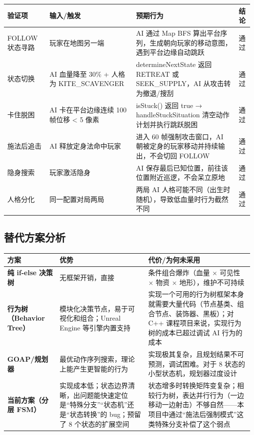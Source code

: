 \documentclass[utf8]{ctexart}
\begin{document}
\begin{longtable}{p{}p{}p{}p{}}
\toprule
\textbf{验证项} & \textbf{输入/触发} & \textbf{预期行为} & \textbf{结论} \\
\midrule
\endfirsthead
\bottomrule
\endhead
FOLLOW 状态寻路 & 玩家在地图另一端 & AI 通过 Map BFS 算出平台序列，生成朝向玩家的移动意图，遇到平台边缘自动跳跃 & 通过 \\
\hline
状态切换 & AI 血量降至 30\% + 人格为 KITE\_SCAVENGER & determineNextState 返回 RETREAT 或 SEEK\_SUPPLY，AI 从攻击转为撤退/搜刮 & 通过 \\
\hline
卡住脱困 & AI 卡在平台边缘连续 100 帧位移 < 5 像素 & isStuck() 返回 true → handleStuckSituation 清空动作计划并执行跳跃脱困 & 通过 \\
\hline
施法后追击 & AI 释放定身法命中玩家 & 进入 60 帧强制攻击窗口，AI 朝被定身的玩家移动并持续输出，不会切回 FOLLOW & 通过 \\
\hline
隐身搜索 & 玩家激活隐身 & AI 保存最后已知位置，前往该位置附近巡逻，不会呆立原地 & 通过 \\
\hline
人格分化 & 同一配置对局两局 & 两局 AI 人格可能不同（出生时随机），导致低血量时行为截然不同 & 通过 \\
\bottomrule
\end{longtable}

\subsection{替代方案分析}

\begin{longtable}{p{}p{}p{}}
\toprule
\textbf{方案} & \textbf{优势} & \textbf{代价/为何未采用} \\
\midrule
\textbf{纯 if-else 决策树} & 无框架开销，直接 & 条件组合爆炸（血量 × 可见性 × 物资 × 地形），维护不可持续 \\
\hline
\textbf{行为树（Behavior Tree）} & 模块化决策节点，易于可视化和组合；Unreal Engine 等引擎内置支持 & 实现一个可用的行为树框架本身就需要大量代码（节点基类、组合节点、装饰器、黑板）；对 C++ 课程项目来说，实现行为树的成本已超过调试 AI 行为的成本 \\
\hline
\textbf{GOAP/规划器} & 最优动作序列搜索，理论上能产生更智能的行为 & 实现极其复杂，且规划结果不可预测，调试困难。对于 8 状态的小型状态机，规划器过度设计 \\
\hline
\textbf{当前方案（分层 FSM）} & 实现成本低；状态边界清晰，出问题能快速定位是“特殊分支”“状态机”还是“状态转换”的 bug；预留了 8 个状态的扩展空间 & 状态增多时转换矩阵变复杂；相较行为树，表达并行行为（一边移动一边射击）不够自然——本项目中通过“施法后强制模式”这类特殊分支补偿了这个弱点 \\
\bottomrule
\end{longtable}
\end{document}
